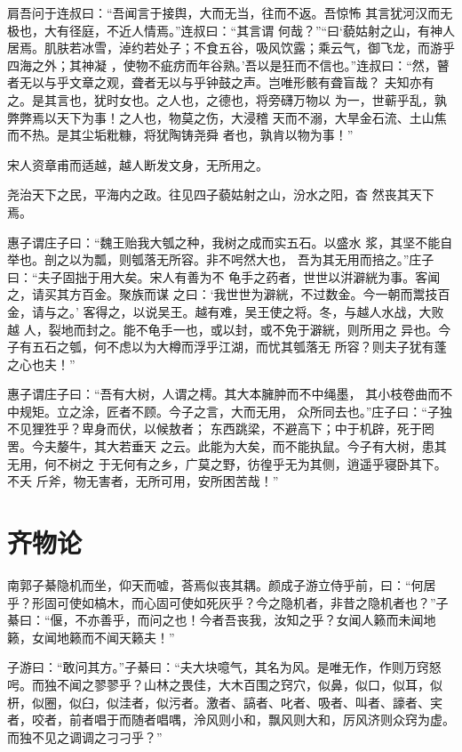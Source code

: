 \documentclass[12pt,UTF8]{ctexbook}
\begin{document}
肩吾问于连叔曰：“吾闻言于接舆，大而无当，往而不返。吾惊怖 其言犹河汉而无极也，大有径庭，不近人情焉。”连叔曰：“其言谓 何哉？”“曰‘藐姑射之山，有神人居焉。肌肤若冰雪，淖约若处子；不食五谷，吸风饮露；乘云气，御飞龙，而游乎四海之外；其神凝 ，使物不疵疠而年谷熟。’吾以是狂而不信也。”连叔曰：“然，瞽 者无以与乎文章之观，聋者无以与乎钟鼓之声。岂唯形骸有聋盲哉？ 夫知亦有之。是其言也，犹时女也。之人也，之德也，将旁礴万物以 为一，世蕲乎乱，孰弊弊焉以天下为事！之人也，物莫之伤，大浸稽 天而不溺，大旱金石流、土山焦而不热。是其尘垢粃糠，将犹陶铸尧舜 者也，孰肯以物为事！”

宋人资章甫而适越，越人断发文身，无所用之。

尧治天下之民，平海内之政。往见四子藐姑射之山，汾水之阳，杳 然丧其天下焉。

惠子谓庄子曰：“魏王贻我大瓠之种，我树之成而实五石。以盛水 浆，其坚不能自举也。剖之以为瓢，则瓠落无所容。非不呺然大也， 吾为其无用而掊之。”庄子曰：“夫子固拙于用大矣。宋人有善为不 龟手之药者，世世以洴澼絖为事。客闻之，请买其方百金。聚族而谋 之曰：‘我世世为澼絖，不过数金。今一朝而鬻技百金，请与之。’ 客得之，以说吴王。越有难，吴王使之将。冬，与越人水战，大败越 人，裂地而封之。能不龟手一也，或以封，或不免于澼絖，则所用之 异也。今子有五石之瓠，何不虑以为大樽而浮乎江湖，而忧其瓠落无 所容？则夫子犹有蓬之心也夫！”

惠子谓庄子曰：“吾有大树，人谓之樗。其大本臃肿而不中绳墨， 其小枝卷曲而不中规矩。立之涂，匠者不顾。今子之言，大而无用， 众所同去也。”庄子曰：“子独不见狸狌乎？卑身而伏，以候敖者； 东西跳梁，不避高下；中于机辟，死于罔罟。今夫嫠牛，其大若垂天 之云。此能为大矣，而不能执鼠。今子有大树，患其无用，何不树之 于无何有之乡，广莫之野，彷徨乎无为其侧，逍遥乎寝卧其下。不夭 斤斧，物无害者，无所可用，安所困苦哉！”

\section{齐物论}

南郭子綦隐机而坐，仰天而嘘，荅焉似丧其耦。颜成子游立侍乎前，曰：“何居乎？形固可使如槁木，而心固可使如死灰乎？今之隐机者，非昔之隐机者也？”子綦曰：“偃，不亦善乎，而问之也！今者吾丧我，汝知之乎？女闻人籁而未闻地籁，女闻地籁而不闻天籁夫！”

子游曰：“敢问其方。”子綦曰：“夫大块噫气，其名为风。是唯无作，作则万窍怒呺。而独不闻之翏翏乎？山林之畏佳，大木百围之窍穴，似鼻，似口，似耳，似枅，似圈，似臼，似洼者，似污者。激者、謞者、叱者、吸者、叫者、譹者、宎者，咬者，前者唱于而随者唱喁，泠风则小和，飘风则大和，厉风济则众窍为虚。而独不见之调调之刁刁乎？”
\end{document}
